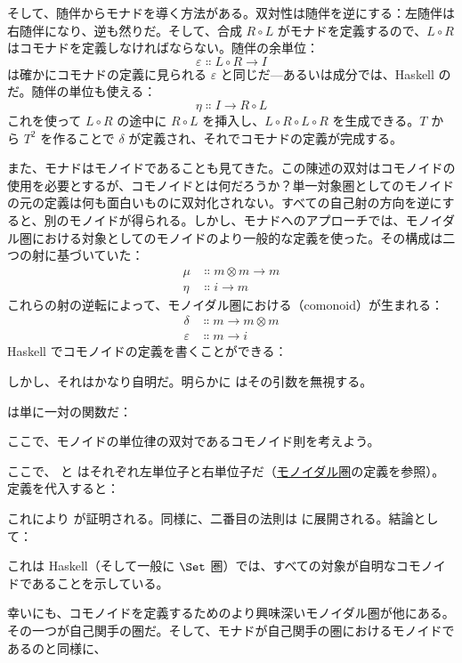そして、随伴からモナドを導く方法がある。双対性は随伴を逆にする：左随伴は右随伴になり、逆も然りだ。そして、合成 $R \circ L$ がモナドを定義するので、$L \circ R$ はコモナドを定義しなければならない。随伴の余単位：
\[\varepsilon \Colon L \circ R \to I\]
は確かにコモナドの定義に見られる $\varepsilon$ と同じだ---あるいは成分では、Haskell の  だ。随伴の単位も使える：
\[\eta \Colon I \to R \circ L\]
これを使って $L \circ R$ の途中に $R \circ L$ を挿入し、$L \circ R \circ L \circ R$ を生成できる。$T$ から $T^2$ を作ることで $\delta$ が定義され、それでコモナドの定義が完成する。

また、モナドはモノイドであることも見てきた。この陳述の双対はコモノイドの使用を必要とするが、コモノイドとは何だろうか？単一対象圏としてのモノイドの元の定義は何も面白いものに双対化されない。すべての自己射の方向を逆にすると、別のモノイドが得られる。しかし、モナドへのアプローチでは、モノイダル圏における対象としてのモノイドのより一般的な定義を使った。その構成は二つの射に基づいていた：
\begin{align*}
  \mu  & \Colon m \otimes m \to m \\
  \eta & \Colon i \to m
\end{align*}
これらの射の逆転によって、モノイダル圏における（comonoid）が生まれる：
\begin{align*}
  \delta      & \Colon m \to m \otimes m \\
  \varepsilon & \Colon m \to i
\end{align*}
Haskell でコモノイドの定義を書くことができる：

しかし、それはかなり自明だ。明らかに  はその引数を無視する。

 は単に一対の関数だ：

ここで、モノイドの単位律の双対であるコモノイド則を考えよう。

ここで、 と  はそれぞれ左単位子と右単位子だ（\hyperref[monads-categorically]{モノイダル圏}の定義を参照）。定義を代入すると：

これにより  が証明される。同様に、二番目の法則は  に展開される。結論として：

これは Haskell（そして一般に $\Set$ 圏）では、すべての対象が自明なコモノイドであることを示している。

幸いにも、コモノイドを定義するためのより興味深いモノイダル圏が他にある。その一つが自己関手の圏だ。そして、モナドが自己関手の圏におけるモノイドであるのと同様に、

